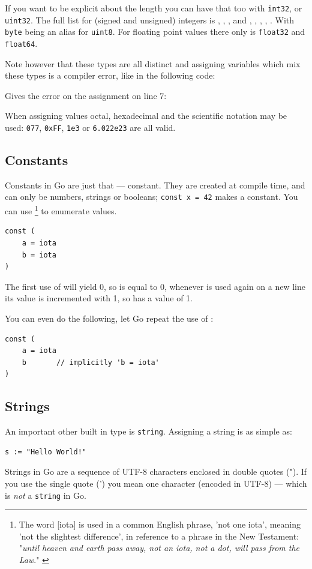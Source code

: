 If you want to be explicit about the length you can have
that too with \lstinline{int32}, or \lstinline{uint32}. The full
list for (signed and unsigned) integers is
, , ,  and
, , , , .
With \lstinline{byte} being an
alias for \lstinline{uint8}. For floating point values there only is
\lstinline{float32} and \lstinline{float64}.

Note however
that these types are all distinct and assigning variables which mix
these types is a compiler error, like in the following code:

Gives the error on the assignment on line 7:

\noindent{}

When assigning values octal, hexadecimal and the scientific notation may be used: 
\lstinline{077}, \lstinline{0xFF}, \lstinline{1e3} or
\mbox{\lstinline{6.022e23}} are all valid.

\subsection{Constants}
\label{sec:constants}
Constants in Go are just that --- constant. They are created at compile
time, and can only be numbers, strings or booleans;
\lstinline{const x = 42} makes  a constant. You can use
 \footnote{The word [iota] is used in a common English phrase,
'not one iota', meaning 'not the slightest difference', in reference to
a phrase in the New Testament: "\emph{until heaven and earth pass away, not an
iota, not a dot, will pass from the Law}." \cite{iota}}
to enumerate values.
\begin{lstlisting}
const (
	a = iota
	b = iota 
)
\end{lstlisting}
The first use of  will yield 0, so  is equal to 0, whenever
 is used again on a new line its value is incremented with 1, so 
has a value of 1.

You can even do the following, let Go repeat the use of :
\begin{lstlisting}
const (
	a = iota
	b	    // implicitly 'b = iota'
)
\end{lstlisting}

\subsection{Strings}
An important other built in type is \lstinline{string}. Assigning a
string is as simple as:
\begin{lstlisting}
s := "Hello World!"
\end{lstlisting}
Strings in Go are a sequence of UTF-8 characters enclosed in double
quotes ("). If you use the single quote (') you mean one character
(encoded in UTF-8) --- which is \emph{not} a \lstinline{string} in Go.

